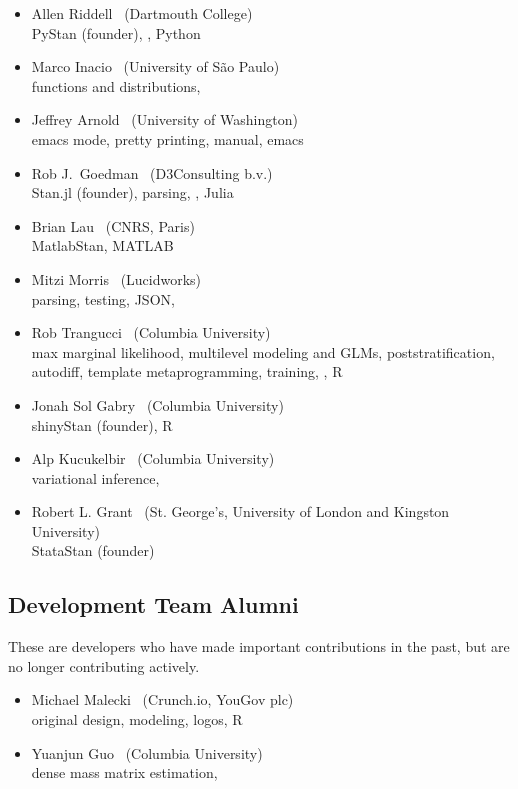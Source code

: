 \begin{itemize}
{  Metropolis, example models, \Cpp}
\item Allen Riddell \   (Dartmouth College)
\\ {\footnotesize PyStan (founder), \Cpp, Python}
\item Marco Inacio \   (University of S\~{a}o Paulo)
\\ {\footnotesize functions and distributions, \Cpp}
\item Jeffrey Arnold \   (University of Washington)
\\ {\footnotesize emacs mode, pretty printing, manual, emacs}
\item Rob J.\ Goedman \ (D3Consulting b.v.)
\\ {\footnotesize Stan.jl (founder), parsing, \Cpp, Julia}
\item Brian Lau \ (CNRS, Paris)
\\ {\footnotesize MatlabStan, MATLAB}
\item Mitzi Morris \   (Lucidworks)
\\ {\footnotesize parsing, testing, JSON, \Cpp}
\item Rob Trangucci \   (Columbia University)
\\ {\footnotesize max marginal likelihood, multilevel modeling and
  GLMs, poststratification, autodiff, template metaprogramming, 
  training, \Cpp, R}
\item Jonah Sol Gabry \ (Columbia University)
\\ {\footnotesize shinyStan (founder), R}
\item Alp Kucukelbir \ (Columbia University)
\\ {\footnotesize variational inference, \Cpp}
\item Robert L. Grant \ (St. George's, University of London and
  Kingston University)
\\ {\footnotesize StataStan (founder)}
\end{itemize}

\subsection*{Development Team Alumni}

These are developers who have made important contributions in the
past, but are no longer contributing actively.

\begin{itemize}
\item Michael Malecki \ (Crunch.io, YouGov plc)
\\ {\footnotesize original design, modeling, logos, R}
\item Yuanjun Guo \ (Columbia University)
\\ {\footnotesize dense mass matrix estimation, \Cpp}
\end{itemize}

